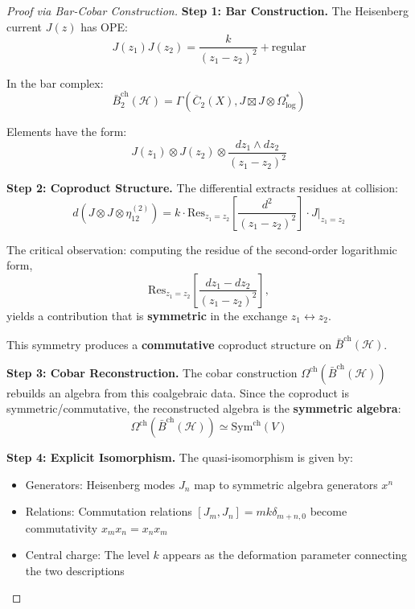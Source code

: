 \begin{proof}[Proof via Bar-Cobar Construction]
\textbf{Step 1: Bar Construction.}
The Heisenberg current $J(z)$ has OPE:
$$J(z_1)J(z_2) = \frac{k}{(z_1-z_2)^2} + \text{regular}$$

In the bar complex:
$$\bar{B}^{\text{ch}}_2(\mathcal{H}) = \Gamma(\overline{C}_2(X), J \boxtimes J \otimes \Omega^*_{\log})$$

Elements have the form:
$$J(z_1) \otimes J(z_2) \otimes \frac{dz_1 \wedge dz_2}{(z_1-z_2)^2}$$

\textbf{Step 2: Coproduct Structure.}
The differential extracts residues at collision:
$$d(J \otimes J \otimes \eta_{12}^{(2)}) = k \cdot \text{Res}_{z_1=z_2}\left[\frac{d^2}{(z_1-z_2)^2}\right] \cdot J|_{z_1=z_2}$$

The critical observation: computing the residue of the second-order logarithmic form,
$$\text{Res}_{z_1=z_2}\left[\frac{dz_1 - dz_2}{(z_1-z_2)^2}\right],$$
yields a contribution that is \textbf{symmetric} in the exchange $z_1 \leftrightarrow z_2$.

This symmetry produces a \textbf{commutative} coproduct structure on $\bar{B}^{\text{ch}}(\mathcal{H})$.

\textbf{Step 3: Cobar Reconstruction.}
The cobar construction $\Omega^{\text{ch}}(\bar{B}^{\text{ch}}(\mathcal{H}))$ rebuilds an algebra from this coalgebraic data. Since the coproduct is symmetric/commutative, the reconstructed algebra is the \textbf{symmetric algebra}:
$$\Omega^{\text{ch}}(\bar{B}^{\text{ch}}(\mathcal{H})) \simeq \text{Sym}^{\text{ch}}(V)$$

\textbf{Step 4: Explicit Isomorphism.}
The quasi-isomorphism is given by:
\begin{itemize}
\item Generators: Heisenberg modes $J_n$ map to symmetric algebra generators $x^n$
\item Relations: Commutation relations $[J_m, J_n] = mk\delta_{m+n,0}$ become commutativity $x_m x_n = x_n x_m$
\item Central charge: The level $k$ appears as the deformation parameter connecting the two descriptions
\end{itemize}
\end{proof}

